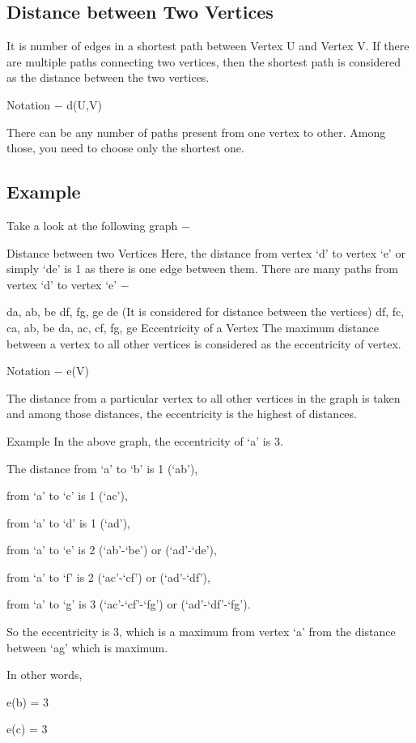 \subsection{Distance between Two Vertices}
It is number of edges in a shortest path between Vertex U and Vertex V. If there are multiple paths connecting two vertices, then the shortest path is considered as the distance between the two vertices.

Notation − d(U,V)

There can be any number of paths present from one vertex to other. Among those, you need to choose only the shortest one.

\subsection{Example}
Take a look at the following graph −

Distance between two Vertices
Here, the distance from vertex ‘d’ to vertex ‘e’ or simply ‘de’ is 1 as there is one edge between them. There are many paths from vertex ‘d’ to vertex ‘e’ −

da, ab, be
df, fg, ge
de (It is considered for distance between the vertices)
df, fc, ca, ab, be
da, ac, cf, fg, ge
Eccentricity of a Vertex
The maximum distance between a vertex to all other vertices is considered as the eccentricity of vertex.

Notation − e(V)

The distance from a particular vertex to all other vertices in the graph is taken and among those distances, the eccentricity is the highest of distances.

Example
In the above graph, the eccentricity of ‘a’ is 3.

The distance from ‘a’ to ‘b’ is 1 (‘ab’),

from ‘a’ to ‘c’ is 1 (‘ac’),

from ‘a’ to ‘d’ is 1 (‘ad’),

from ‘a’ to ‘e’ is 2 (‘ab’-‘be’) or (‘ad’-‘de’),

from ‘a’ to ‘f’ is 2 (‘ac’-‘cf’) or (‘ad’-‘df’),

from ‘a’ to ‘g’ is 3 (‘ac’-‘cf’-‘fg’) or (‘ad’-‘df’-‘fg’).

So the eccentricity is 3, which is a maximum from vertex ‘a’ from the distance between ‘ag’ which is maximum.

In other words,

e(b) = 3

e(c) = 3

